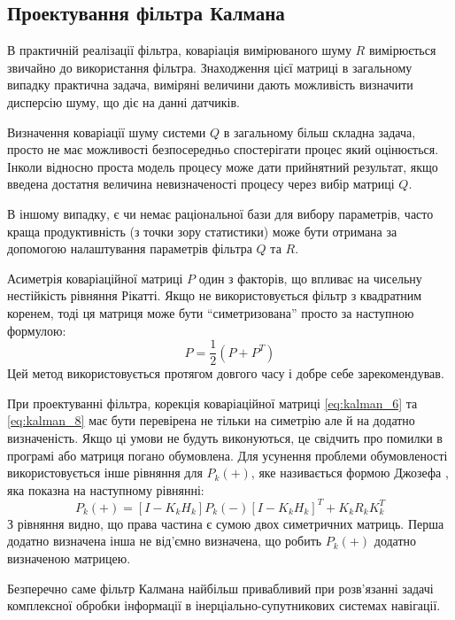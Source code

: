\subsection{Проектування фільтра Калмана}

В практичній реалізації фільтра, коваріація вимірюваного шуму $R$ вимірюється
звичайно до використання фільтра. Знаходження цієї матриці в загальному випадку
практична задача, виміряні величини дають можливість визначити дисперсію шуму, що
діє на данні датчиків.

Визначення коваріації шуму системи $Q$ в загальному більш складна задача,
просто не має можливості безпосередньо спостерігати процес який оцінюється.
Інколи відносно проста модель процесу може дати прийнятний результат, якщо
введена достатня величина невизначеності процесу через вибір матриці $Q$.

В іншому випадку, є чи немає раціональної бази для вибору параметрів, часто
краща продуктивність (з точки зору статистики) може бути отримана за допомогою
налаштування параметрів фільтра $Q$ та $R$. 

Асиметрія коваріаційної матриці $P$ один з факторів, що впливає на чисельну
нестійкість рівняння Рікатті. Якщо не використовується фільтр з квадратним
коренем, тоді ця матриця може бути ``симетризована'' просто за наступною 
формулою:
\begin{equation}
 \label{P_symetry}
P= \frac{1}{2}(P+P^{T})
\end{equation}
Цей метод використовується протягом довгого часу і добре себе зарекомендував.

При проектуванні фільтра, корекція коваріаційної матриці \eqref{eq:kalman_6} та
\eqref{eq:kalman_8} має бути перевірена не тільки на симетрію але й на 
додатно визначеність.
Якщо ці умови не будуть виконуються, це свідчить про помилки в програмі або
матриця погано обумовлена. Для усунення проблеми обумовленості використовується
інше рівняння для $P_{k}(+)$, яке називається формою Джозефа \cite{joseph}, яка показна на
наступному рівнянні:
\begin{equation}
 \label{P_plus_Joseph}
P_{k}(+)=[I-K_{k}H_{k}]P_{k}(-)[I-K_{k}H_{k}]^{T}+K_{k}R_{k}K_{k}^{T}
\end{equation}
З рівняння видно, що права частина є сумою двох симетричних матриць.
Перша додатно визначена інша не від'ємно визначена, що робить $P_{k}(+)$ 
додатно визначеною матрицею.

Безперечно саме фільтр Калмана найбільш привабливий при розв’язанні задачі 
комплексної обробки інформації в інерціально-супутникових системах навігації. 
